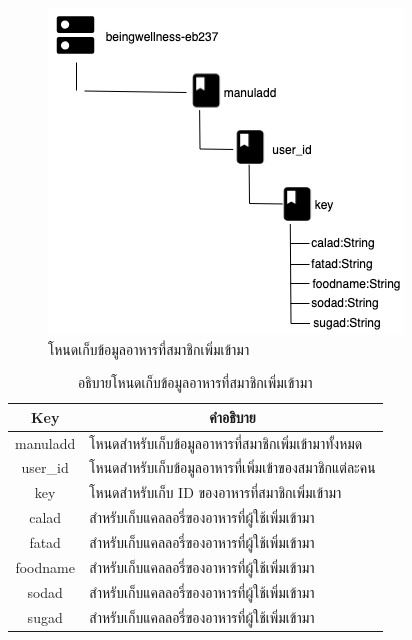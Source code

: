 \newpage
\begin{figure}[H]
	\centering
	\includegraphics[width=0.7\columnwidth]
	{Figures/3/DB/manuladd.png}
	\caption{โหนดเก็บข้อมูลอาหารที่สมาชิกเพิ่มเข้ามา}
	\label{Fig:DB4}
\end{figure}
\begin{table}[H]
	\centering
	\caption{อธิบายโหนดเก็บข้อมูลอาหารที่สมาชิกเพิ่มเข้ามา}
	\label{my-label1}
	\begin{tabular}{|c|p{10cm}|}
		\hline
		\multicolumn{1}{|c|}{\textbf{Key}} & \multicolumn{1}{c|}{\textbf{คำอธิบาย}} \\ \hline
		manuladd & โหนดสำหรับเก็บข้อมูลอาหารที่สมาชิกเพิ่มเข้ามาทั้งหมด \\ \hline
		user\_id &  โหนดสำหรับเก็บข้อมูลอาหารที่เพิ่มเข้าของสมาชิกแต่ละคน\\ \hline
		key & โหนดสำหรับเก็บ ID ของอาหารที่สมาชิกเพิ่มเข้ามา \\ \hline
		calad & สำหรับเก็บแคลลอรี่ของอาหารที่ผู้ใช้เพิ่มเข้ามา \\ \hline
		fatad & สำหรับเก็บแคลลอรี่ของอาหารที่ผู้ใช้เพิ่มเข้ามา\\ \hline
		foodname & สำหรับเก็บแคลลอรี่ของอาหารที่ผู้ใช้เพิ่มเข้ามา\\ \hline
		sodad & สำหรับเก็บแคลลอรี่ของอาหารที่ผู้ใช้เพิ่มเข้ามา\\ \hline
		sugad & สำหรับเก็บแคลลอรี่ของอาหารที่ผู้ใช้เพิ่มเข้ามา\\ \hline

	\end{tabular}
\end{table}

